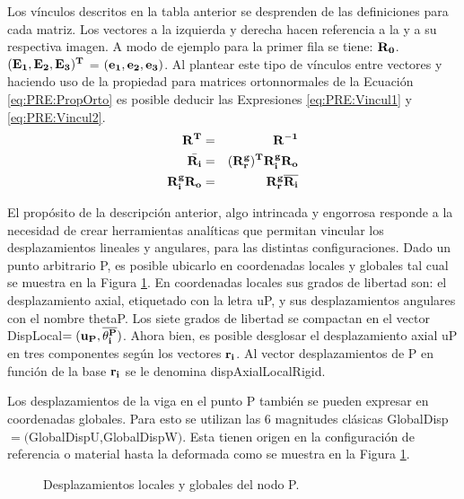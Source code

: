 Los vínculos descritos en la tabla anterior se desprenden de las definiciones para cada matriz. Los vectores a la izquierda y derecha hacen referencia a la y a su respectiva imagen. A modo de ejemplo para la primer fila se tiene: $\bf{R}_0$. $(\bf{E_1},\bf{E_2},\bf{E_3})^T$ = $(\bf{e_1},\bf{e_2},\bf{e_3})$. Al plantear este tipo de vínculos entre vectores y haciendo uso de la propiedad para matrices ortonnormales de la Ecuación \ref{eq:PRE:PropOrto} es posible deducir las Expresiones \eqref{eq:PRE:Vincul1} y \eqref{eq:PRE:Vincul2}.
%
%
\begin{eqnarray}
		\label{eq:PRE:PropOrto}
		\bf{R}^T&=&\bf{R}^{-1}\\
		\label{eq:PRE:Vincul1}
		\bar{\bf{R_i}}&= &(\bf{R_r^g})^T\bf{R_i^g}\bf{R_o}\\
		\label{eq:PRE:Vincul2}
		\bf{R_i^g}\bf{R_o} &=& \bf{R_r^g}\overline{\bf{R_i}}
	\end{eqnarray}


El propósito de la descripción anterior, algo intrincada y engorrosa responde a la necesidad de crear herramientas analíticas que permitan vincular los
desplazamientos lineales y angulares, para las distintas configuraciones. Dado un punto arbitrario P, es posible ubicarlo en coordenadas locales y
globales tal cual se muestra en la Figura \ref{fig:PRE:IlusCorrotDisps}. En coordenadas locales sus grados de libertad son: el desplazamiento axial, etiquetado con la letra \gls{uP}, y sus desplazamientos angulares con el nombre \gls{thetaP}. Los siete grados de libertad se compactan en el vector \gls{DispLocal}$=(\bf{u_P},\bf{\overline{\theta_i^P}})$. Ahora bien, es posible desglosar el desplazamiento axial \gls{uP} en tres componentes según los vectores $\bf{r_i}$. Al vector desplazamientos de P en función de la base  $\bf{r_i}$ se le denomina \gls{dispAxialLocalRigid}.

Los desplazamientos de la viga en el punto P también se pueden expresar en coordenadas globales.  Para esto se utilizan las 6 magnitudes clásicas
\gls{GlobalDisp}$=($\gls{GlobalDispU},\gls{GlobalDispW}$)$. Esta tienen origen en la configuración de referencia o material hasta la deformada como se muestra en la Figura
\ref{fig:PRE:IlusCorrotDisps}.

\begin{figure}[htbp]
	\centering
	\def\svgwidth{100mm}
	
	\caption{Desplazamientos locales y globales del nodo P.}
	\label{fig:PRE:IlusCorrotDisps}
\end{figure}

